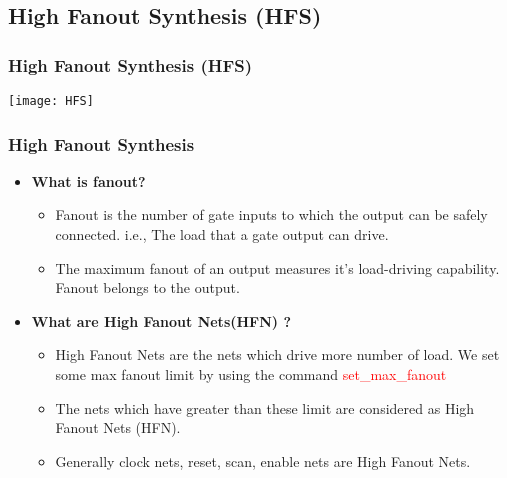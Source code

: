 \documentclass[compress]{beamer}
\begin{document}
\subsection[HFNS]{High Fanout Synthesis (HFS)}
\begin{frame}
	\frametitle{High Fanout Synthesis (HFS)}
	\begin{center}
		\texttt{[image: HFS]}
	\end{center}
\end{frame}
\begin{frame}
	\frametitle{High Fanout Synthesis}
	\begin{itemize}
		\item \textbf{What is fanout?}
			\begin{itemize}
				\item Fanout is the number of gate inputs to which the output can be safely connected. i.e., The load that a gate output can drive. 
				\item The maximum fanout of an output measures it’s load-driving capability. Fanout belongs to the output.
			\end{itemize}
		\item \textbf{What are High Fanout Nets(HFN) ?}
		\begin{itemize}
			\item High Fanout Nets are the nets which drive more number of load. We set some max fanout limit by using the command \textcolor{red}{set\_max\_fanout}
			\item The nets which have greater than these limit are considered as High Fanout Nets (HFN). 
			\item Generally clock nets, reset, scan, enable nets are High Fanout Nets.
		\end{itemize}
	\end{itemize}
\end{frame}
\end{document}
